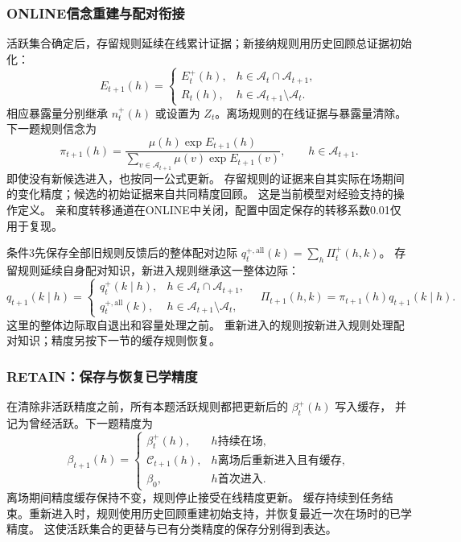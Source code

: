 \documentclass[11pt,a4paper]{article}
\numberwithin{equation}{section}
\newcommand{\A}{\mathcal{A}}
\begin{document}
\subsubsection{ONLINE信念重建与配对衔接}
\label{sec:online}
活跃集合确定后，存留规则延续在线累计证据；新接纳规则用历史回顾总证据初始化：
\begin{equation}
E_{t+1}(h)=
\begin{cases}
E_t^+(h),&h\in\A_t\cap\A_{t+1},\\
R_t(h),&h\in\A_{t+1}\setminus\A_t.
\end{cases}
\label{eq:evidence-admit}
\end{equation}
相应暴露量分别继承 $n_t^+(h)$ 或设置为 $Z_t$。离场规则的在线证据与暴露量清除。
下一题规则信念为
\begin{equation}
\pi_{t+1}(h)=\frac{\mu(h)\exp E_{t+1}(h)}
{\sum_{v\in\A_{t+1}}\mu(v)\exp E_{t+1}(v)},\qquad h\in\A_{t+1}.
\label{eq:online-prior}
\end{equation}
即使没有新候选进入，也按同一公式更新。
存留规则的证据来自其实际在场期间的变化精度；候选的初始证据来自共同精度回顾。
这是当前模型对经验支持的操作定义。
亲和度转移通道在ONLINE中关闭，配置中固定保存的转移系数0.01仅用于复现。

条件3先保存全部旧规则反馈后的整体配对边际
$q_t^{+,\mathrm{all}}(k)=\sum_h\Pi_t^+(h,k)$。
存留规则延续自身配对知识，新进入规则继承这一整体边际：
\begin{equation}
q_{t+1}(k\mid h)=
\begin{cases}
q_t^+(k\mid h),&h\in\A_t\cap\A_{t+1},\\
q_t^{+,\mathrm{all}}(k),&h\in\A_{t+1}\setminus\A_t,
\end{cases}
\quad \Pi_{t+1}(h,k)=\pi_{t+1}(h)q_{t+1}(k\mid h).
\end{equation}
这里的整体边际取自退出和容量处理之前。
重新进入的规则按新进入规则处理配对知识；精度另按下一节的缓存规则恢复。

\subsubsection{RETAIN：保存与恢复已学精度}
\label{sec:retain}
在清除非活跃精度之前，所有本题活跃规则都把更新后的 $\beta_t^+(h)$ 写入缓存，
并记为曾经活跃。下一题精度为
\begin{equation}
\beta_{t+1}(h)=
\begin{cases}
\beta_t^+(h),&h\text{持续在场},\\
\mathcal C_{t+1}(h),&h\text{离场后重新进入且有缓存},\\
\beta_0,&h\text{首次进入}.
\end{cases}
\label{eq:retain}
\end{equation}
离场期间精度缓存保持不变，规则停止接受在线精度更新。
缓存持续到任务结束。重新进入时，规则使用历史回顾重建初始支持，并恢复最近一次在场时的已学精度。
这使活跃集合的更替与已有分类精度的保存分别得到表达。
\end{document}
